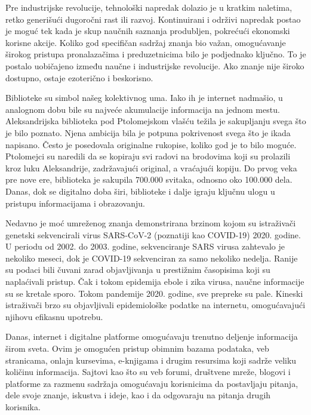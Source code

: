 \documentclass{article}
\begin{document}
Pre industrijske revolucije, tehnološki napredak dolazio je u kratkim naletima, retko generišući dugoročni rast ili razvoj. Kontinuirani i održivi napredak postao je moguć tek kada je skup naučnih saznanja produbljen, pokrećući ekonomski korisne akcije. Koliko god specifičan sadržaj znanja bio važan, omogućavanje širokog pristupa pronalazačima i preduzetnicima bilo je podjednako ključno. To je postalo uobičajeno između naučne i industrijske revolucije. Ako znanje nije široko dostupno, ostaje ezoterično i beskorisno.

Biblioteke su simbol našeg kolektivnog uma. Iako ih je internet nadmašio, u analognom dobu bile su najveće akumulacije informacija na jednom mestu. Aleksandrijska biblioteka pod Ptolomejskom vlašću težila je sakupljanju svega što je bilo poznato. Njena ambicija bila je potpuna pokrivenost svega što je ikada napisano. Često je posedovala originalne rukopise, koliko god je to bilo moguće. Ptolomejci su naredili da se kopiraju svi radovi na brodovima koji su prolazili kroz luku Aleksandrije, zadržavajući original, a vraćajući kopiju. Do prvog veka pre nove ere, biblioteka je sakupila 700.000 svitaka, odnosno oko 100.000 dela. Danas, dok se digitalno doba širi, biblioteke i dalje igraju ključnu ulogu u pristupu informacijama i obrazovanju.

Nedavno je moć umreženog znanja demonstrirana brzinom kojom su istraživači genetski sekvencirali virus SARS-CoV-2 (poznatiji kao COVID-19) 2020. godine. U periodu od 2002. do 2003. godine, sekvenciranje SARS virusa zahtevalo je nekoliko meseci, dok je COVID-19 sekvenciran za samo nekoliko nedelja. Ranije su podaci bili čuvani zarad objavljivanja u prestižnim časopisima koji su naplaćivali pristup. Čak i tokom epidemija ebole i zika virusa, naučne informacije su se kretale sporo. Tokom pandemije 2020. godine, sve prepreke su pale. Kineski istraživači brzo su objavljivali epidemiološke podatke na internetu, omogućavajući njihovu efikasnu upotrebu.

Danas, internet i digitalne platforme omogućavaju trenutno deljenje informacija širom sveta. Ovim je omogućen pristup obimnim bazama podataka, veb stranicama, onlajn kursevima, e-knjigama i drugim resursima koji sadrže veliku količinu informacija. Sajtovi kao što su veb forumi, društvene mreže, blogovi i platforme za razmenu sadržaja omogućavaju korisnicima da postavljaju pitanja, dele svoje znanje, iskustva i ideje, kao i da odgovaraju na pitanja drugih korisnika.

\end{document}

